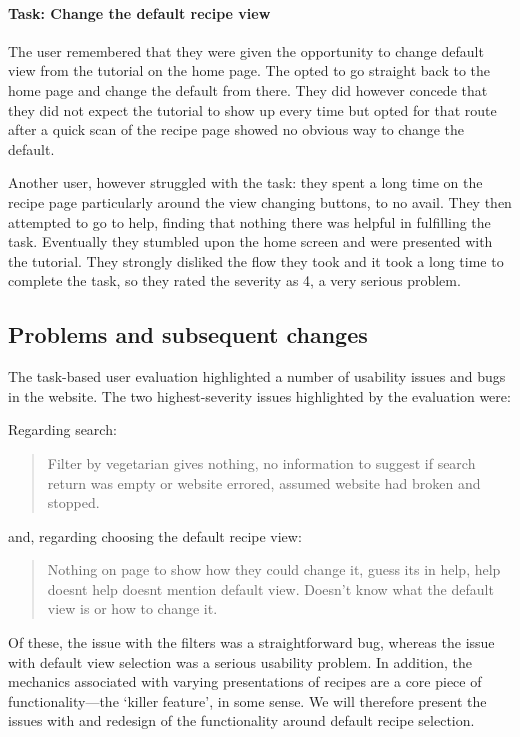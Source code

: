 \paragraph{Task: Change the default recipe view}

The user remembered that they were given the opportunity to change
default view from the tutorial on the home page. The opted to go
straight back to the home page and change the default from there. They
did however concede that they did not expect the tutorial to show up
every time but opted for that route after a quick scan of the recipe
page showed no obvious way to change the default.

Another user, however struggled with the task: they spent a long time
on the recipe page particularly around the view changing buttons, to
no avail. They then attempted to go to help, finding that nothing
there was helpful in fulfilling the task. Eventually they stumbled
upon the home screen and were presented with the tutorial. They
strongly disliked the flow they took and it took a long time to
complete the task, so they rated the severity as 4, a very serious
problem.

\subsection{Problems and subsequent changes}

The task-based user evaluation highlighted a number of usability
issues and bugs in the website. The two highest-severity issues
highlighted by the evaluation were:

Regarding search:
\begin{quote}
  \footnotesize
  Filter by vegetarian gives nothing, no information to suggest if
  search return was empty or website errored, assumed website had
  broken and stopped.
\end{quote}

and, regarding choosing the default recipe view:
\begin{quote}
  \footnotesize
  Nothing on page to show how they could change it, guess its in help,
  help doesnt help doesnt mention default view. Doesn’t know what the
  default view is or how to change it.
\end{quote}

Of these, the issue with the filters was a straightforward bug,
whereas the issue with default view selection was a serious usability
problem. In addition, the mechanics associated with varying
presentations of recipes are a core piece of functionality---the
`killer feature', in some sense. We will therefore present the issues
with and redesign of the functionality around default recipe selection.

